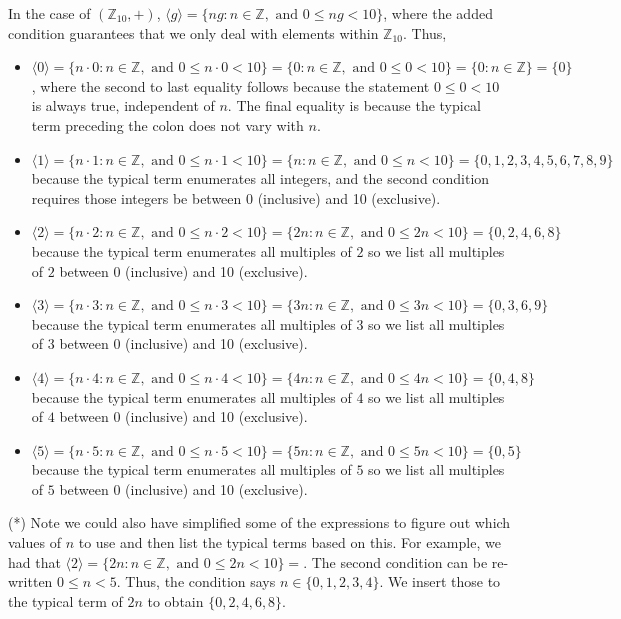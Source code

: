 \documentclass[12pt]{article}
\def\Z{{\mathbb Z}}        %
\numberwithin{theorem}{section}
\numberwithin{equation}{section}
\numberwithin{remark}{section}
\numberwithin{definition}{section}
\numberwithin{theorem}{section}
\numberwithin{lemma}{section}
\numberwithin{example}{section}
\begin{document}
In the case of $(\Z_{10},+)$, $\langle g \rangle=\{ng:n\in\Z,\text{ and }0\le ng<10\}$, where the added condition guarantees that we only deal with elements within $\Z_{10}$. Thus,
\begin{itemize}
	\item{$\langle 0 \rangle=\{n\cdot0:n\in\Z,\text{ and }0\le n\cdot0<10\}=\{0:n\in\Z,\text{ and }0\le 0<10\}=\{0:n\in\Z\}=\{0\}$, where the second to last equality follows because the statement $0\le 0 < 10$ is always true, independent of $n$. The final equality is because the typical term preceding the colon does not vary with $n$.}
	\item{$\langle 1 \rangle=\{n\cdot1:n\in\Z,\text{ and }0\le n\cdot1<10\}=\{n:n\in\Z,\text{ and }0\le n<10\}=\{0,1,2,3,4,5,6,7,8,9\}$ because the typical term enumerates all integers, and the second condition requires those integers be between 0 (inclusive) and 10 (exclusive).}
	\item{$\langle 2 \rangle=\{n\cdot2:n\in\Z,\text{ and }0\le n\cdot2<10\}=\{2n:n\in\Z,\text{ and }0\le 2n<10\}=\{0,2,4,6,8\}$ because the typical term enumerates all multiples of $2$ so we list all multiples of $2$ between 0 (inclusive) and 10 (exclusive).}
	\item{$\langle 3 \rangle=\{n\cdot3:n\in\Z,\text{ and }0\le n\cdot3<10\}=\{3n:n\in\Z,\text{ and }0\le 3n<10\}=\{0,3,6,9\}$ because the typical term enumerates all multiples of $3$ so we list all multiples of $3$ between 0 (inclusive) and 10 (exclusive).}
	\item{$\langle 4 \rangle=\{n\cdot4:n\in\Z,\text{ and }0\le n\cdot4<10\}=\{4n:n\in\Z,\text{ and }0\le 4n<10\}=\{0,4,8\}$ because the typical term enumerates all multiples of $4$ so we list all multiples of $4$ between 0 (inclusive) and 10 (exclusive).}
	\item{$\langle 5 \rangle=\{n\cdot5:n\in\Z,\text{ and }0\le n\cdot5<10\}=\{5n:n\in\Z,\text{ and }0\le 5n<10\}=\{0,5\}$ because the typical term enumerates all multiples of $5$ so we list all multiples of $5$ between 0 (inclusive) and 10 (exclusive).}
\end{itemize}

\vspace{\baselineskip}

\noindent (*) Note we could also have simplified some of the expressions to figure out which values of $n$ to use and then list the typical terms based on this. For example, we had that $\langle 2 \rangle=\{2n:n\in\Z,\text{ and }0\le 2n<10\}=$. The second condition can be re-written $0\le n < 5$. Thus, the condition says $n\in\{0,1,2,3,4\}$. We insert those to the typical term of $2n$ to obtain $\{0,2,4,6,8\}$.
\end{document}
